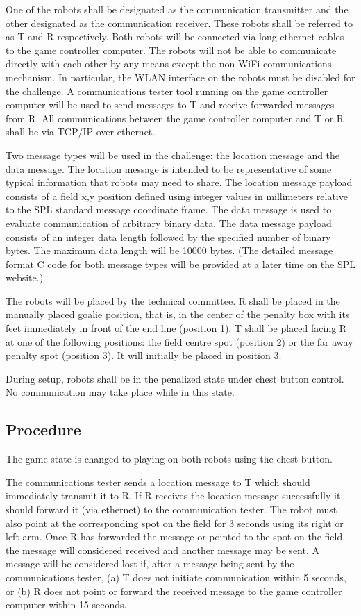 \documentclass[12pt]{article}
\begin{document}
One of the robots shall be designated as
the communication transmitter and the other designated as the communication receiver. 
These robots shall be referred to as T and R respectively.
Both robots will be connected via long ethernet cables to the game controller computer.
The robots will not be able to communicate directly with each other by any means except the non-WiFi communications mechanism. In particular, the WLAN interface on the robots must be disabled for the challenge.
A communications tester tool running on the game controller computer will be used to send messages to T and receive forwarded messages from R. 
All communications between the game controller computer and T or R shall be via TCP/IP over ethernet.

Two message types will be used in the challenge: the location message and the data message. The location message is intended to be representative of some typical information that robots may need to share. The location message  payload consists of a field x,y position defined using integer values in millimeters relative to the SPL standard message coordinate frame.
The data message is used to evaluate communication of arbitrary binary data. The data message payload consists of an integer data length followed by the specified number of binary bytes. The maximum data length will be 10000 bytes. (The detailed message format C code for both message types will be provided at a later time on the SPL website.)

The robots will be placed by the technical committee. 
R shall be placed in the manually placed goalie
position, that is, in the center of the penalty box with its feet immediately in front of the end line (position 1).
T shall be placed facing R at one of the following positions: the field centre spot (position 2) or the far away penalty spot (position 3). It will initially be placed in position 3.

During setup, robots shall be in the penalized state under chest button control. No communication may take place while in this state.

\subsection{Procedure}
The game state is changed to playing on both robots using the chest button.

The communications tester sends a location message to T which should immediately transmit it to R.
If R receives the location message successfully it should forward it (via ethernet) to the communication tester. The robot must also point at the corresponding spot on the field for 3 seconds using its right or left arm. Once R has forwarded the message or pointed to the spot on the field, the message will considered received and another message may be sent. A message will be considered lost if, after a message being sent by the communications tester, (a) T does not initiate communication within 5 seconds, or (b) R does not point or forward the received message to the game controller computer within 15 seconds.
\end{document}
